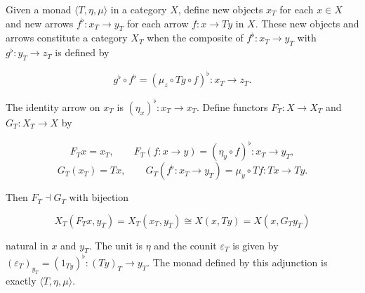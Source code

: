 Given a monad $\langle T, \eta, \mu \rangle$ in a category $X$, define new objects $x_T$ for each $x \in X$ and new arrows $f^\flat : x_T \to y_T$ for each arrow $f : x \to Ty$ in $X$. These new objects and arrows constitute a category $X_T$ when the composite of $f^\flat : x_T \to y_T$ with $g^\flat : y_T \to z_T$ is defined by

$$g^\flat \circ f^\flat = (\mu_z \circ Tg \circ f)^\flat : x_T \to z_T.$$

The identity arrow on $x_T$ is $(\eta_x)^\flat : x_T \to x_T$. Define functors $F_T : X \to X_T$ and $G_T : X_T \to X$ by

$$F_T x = x_T, \qquad F_T (f : x \to y) = (\eta_y \circ f)^\flat : x_T \to y_T,$$
$$G_T (x_T) = T x, \qquad G_T (f^\flat : x_T \to y_T) = \mu_y \circ T f : T x \to T y.$$

Then $F_T \dashv G_T$ with bijection

$$X_T(F_T x, y_T) = X_T(x_T, y_T) \cong X(x, T y) = X(x, G_T y_T)$$

natural in $x$ and $y_T$. The unit is $\eta$ and the counit $\varepsilon_T$ is given by $(\varepsilon_T)_{y_T} = (1_{T y})^\flat : (T y)_T \to y_T$. The monad defined by this adjunction is exactly $\langle T, \eta, \mu \rangle$.

